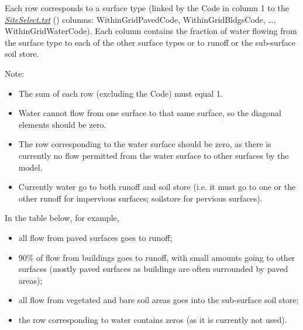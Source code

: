 \documentclass[letterpaper,10pt,english]{sphinxmanual}
\begin{document}
Each row corresponds to a surface type (linked by the Code in column 1
to the {\hyperref[\detokenize{input_files/SUEWS_SiteInfo/SUEWS_WithinGridWaterDist:SiteSelect.txt}]{\emph{SiteSelect.txt}}} () columns:
WithinGridPavedCode, WithinGridBldgsCode, …, WithinGridWaterCode). Each
column contains the fraction of water flowing from the surface type to
each of the other surface types or to runoff or the sub-surface soil
store.

Note:
\begin{itemize}
\item {} 
The sum of each row (excluding the Code) must equal 1.

\item {} 
Water cannot flow from one surface to that same surface, so the
diagonal elements should be zero.

\item {} 
The row corresponding to the water surface should be zero, as there
is currently no flow permitted from the water surface to other
surfaces by the model.

\item {} 
Currently water  go to both runoff and soil store (i.e. it
must go to one or the other \textendash{} runoff for impervious surfaces;
soilstore for pervious surfaces).

\end{itemize}

In the table below, for example,
\begin{itemize}
\item {} 
all flow from paved surfaces goes to runoff;

\item {} 
90\% of flow from buildings goes to runoff, with small amounts going
to other surfaces (mostly paved surfaces as buildings are often
surrounded by paved areas);

\item {} 
all flow from vegetated and bare soil areas goes into the sub-surface
soil store;

\item {} 
the row corresponding to water contains zeros (as it is currently not
used).

\end{itemize}
\end{document}

